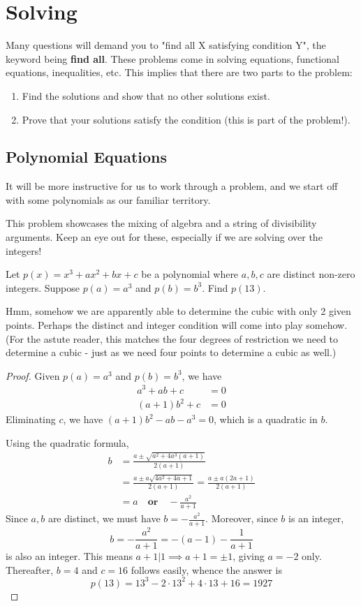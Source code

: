 \documentclass[../jarvis.tex]{subfiles}
\begin{document}
\section{Solving}
Many questions will demand you to "find all X satisfying condition Y", the keyword being \textbf{find all}. These problems come in solving equations, functional equations, inequalities, etc. This implies that there are two parts to the problem:
\begin{enumerate}
    \item Find the solutions and show that no other solutions exist.
    \item Prove that your solutions satisfy the condition (this is part of the problem!).
\end{enumerate}

\subsection{Polynomial Equations}
It will be more instructive for us to work through a problem, and we start off with some polynomials as our familiar territory.

This problem showcases the mixing of algebra and a string of divisibility arguments. Keep an eye out for these, especially if we are solving over the integers!
\begin{example}[2018 SMO(O) P9]
    Let $p(x)=x^3+ax^2+bx+c$ be a polynomial where $a,b,c$ are distinct non-zero integers. Suppose $p(a)=a^3$ and $p(b)=b^3$. Find $p(13)$.
\end{example}
Hmm, somehow we are apparently able to determine the cubic with only 2 given points. Perhaps the distinct and integer condition will come into play somehow. (For the astute reader, this matches the four degrees of restriction we need to determine a cubic - just as we need four points to determine a cubic as well.)
\begin{proof}
    Given $p(a)=a^3$ and $p(b)=b^3$, we have 
    \begin{align*}
        a^3+ab+c&=0\\
        (a+1)b^2+c&=0
    \end{align*}
    Eliminating $c$,
    we have $(a+1)b^2-ab-a^3=0$, which is a quadratic in $b$.
    
    Using the quadratic formula,
    \begin{align*}
        b&=\frac{a\pm \sqrt{a^2+4a^3(a+1)}}{2(a+1)}\\
        &=\frac{a\pm a\sqrt{4a^2+4a+1}}{2(a+1)}=\frac{a\pm a(2a+1)}{2(a+1)} \\
        &=a \quad \textbf{or} \quad -\frac{a^2}{a+1}
    \end{align*}
    Since $a,b$ are distinct, we must have $b=-\frac{a^2}{a+1}.$
    Moreover, since $b$ is an integer, 
    $$b=-\frac{a^2}{a+1}=-(a-1)-\frac{1}{a+1}$$
    is also an integer. This means $a+1|1 \implies a+1=\pm 1$, giving $a=-2$ only. Thereafter, $b=4$ and $c=16$ follows easily, whence the answer is 
    $$p(13)=13^3-2\cdot 13^2+4\cdot 13+16=\boxed{1927}$$
\end{proof}
\end{document}
